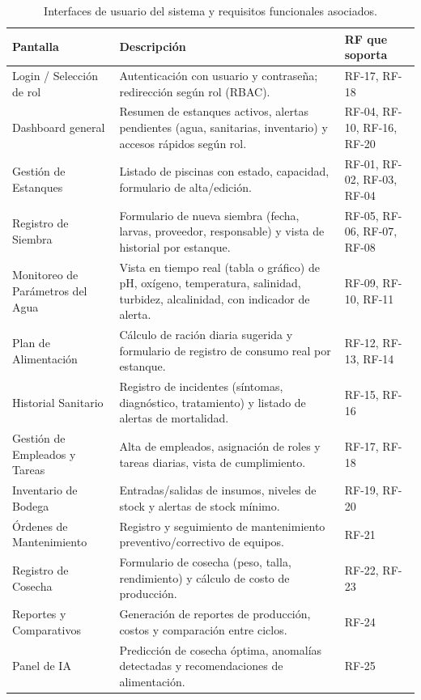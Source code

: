 \documentclass[11pt,a4paper]{article}
\begin{document}
\begin{longtable}{|p{4cm}|p{7cm}|p{4cm}|}
\caption{Interfaces de usuario del sistema y requisitos funcionales asociados.}
\label{tab:interfaz_usuario} \\
\hline
\textbf{Pantalla} & \textbf{Descripción} & \textbf{RF que soporta} \\
\hline

Login / Selección de rol & Autenticación con usuario y contraseña; redirección según rol (RBAC). & RF-17, RF-18 \\
\hline

Dashboard general & Resumen de estanques activos, alertas pendientes (agua, sanitarias, inventario) y accesos rápidos según rol. & RF-04, RF-10, RF-16, RF-20 \\
\hline

Gestión de Estanques & Listado de piscinas con estado, capacidad, formulario de alta/edición. & RF-01, RF-02, RF-03, RF-04 \\
\hline

Registro de Siembra & Formulario de nueva siembra (fecha, larvas, proveedor, responsable) y vista de historial por estanque. & RF-05, RF-06, RF-07, RF-08 \\
\hline

Monitoreo de Parámetros del Agua & Vista en tiempo real (tabla o gráfico) de pH, oxígeno, temperatura, salinidad, turbidez, alcalinidad, con indicador de alerta. & RF-09, RF-10, RF-11 \\
\hline

Plan de Alimentación & Cálculo de ración diaria sugerida y formulario de registro de consumo real por estanque. & RF-12, RF-13, RF-14 \\
\hline

Historial Sanitario & Registro de incidentes (síntomas, diagnóstico, tratamiento) y listado de alertas de mortalidad. & RF-15, RF-16 \\
\hline

Gestión de Empleados y Tareas & Alta de empleados, asignación de roles y tareas diarias, vista de cumplimiento. & RF-17, RF-18 \\
\hline

Inventario de Bodega & Entradas/salidas de insumos, niveles de stock y alertas de stock mínimo. & RF-19, RF-20 \\
\hline

Órdenes de Mantenimiento & Registro y seguimiento de mantenimiento preventivo/correctivo de equipos. & RF-21 \\
\hline

Registro de Cosecha & Formulario de cosecha (peso, talla, rendimiento) y cálculo de costo de producción. & RF-22, RF-23 \\
\hline

Reportes y Comparativos & Generación de reportes de producción, costos y comparación entre ciclos. & RF-24 \\
\hline

Panel de IA & Predicción de cosecha óptima, anomalías detectadas y recomendaciones de alimentación. & RF-25 \\
\hline

\end{longtable}
\end{document}
